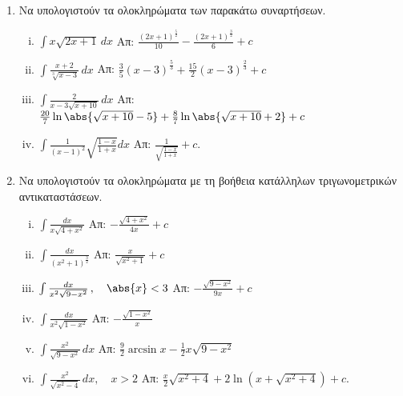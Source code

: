 \begin{enumerate}
  \item Να υπολογιστούν τα ολοκληρώματα των παρακάτω συναρτήσεων.
    \begin{enumerate}[i)]
      \item $\int x\sqrt{2x+1}\,dx$ 
        \hfill Απ: $\frac{(2x+1)^{\frac{5}{2}}}{10}-\frac{(2x+1)^{\frac{3}{2}}}{6}+c$
      \item $\int\frac{x+2}{\sqrt[3]{x-3}}\,dx$ 
        \hfill Απ: $\frac{3}{5}(x-3)^{\frac{5}{3}}+\frac{15}{2}(x-3)^{\frac{2}{3}}+c$
      \item $\int\frac{2}{x-3\sqrt{x+10}}\,dx$ 
        \hfill Απ: $\frac{20}{7}\ln\abs{\sqrt{x+10}-5}+\frac{8}{7}\ln
        \abs{\sqrt{x+10}+2}+c$
      \item $\int\frac{1}{(x-1)^2}\sqrt{\frac{1-x}{1+x}}dx$
        \hfill Απ: $\frac{1}{\sqrt{\frac{1-x}{1+x}}}+c$.
    \end{enumerate}

  \item Να υπολογιστούν τα ολοκληρώματα με τη βοήθεια κατάλληλων τριγωνομετρικών 
    αντικαταστάσεων.
    \begin{enumerate}[i)]
      \item $\int\frac{dx}{x\sqrt{4+x^2}}$ \hfill Απ: $-\frac{\sqrt{4+x^2}}{4x}+c$
      \item $\int\frac{dx}{(x^2+1)^{\frac{3}{2}}}$ \hfill Απ: $\frac{x}{\sqrt{x^2+1}}+c$
      \item $\int\frac{dx}{x^2\sqrt{9-x^2}}\,,\quad \abs{x}<3$ 
        \hfill Απ: $-\frac{\sqrt{9-x^2}}{9x}+c$
      \item $\int \frac{dx}{x^{2}\sqrt{1-x^{2}}}$ \hfill Απ: $-\frac{\sqrt{1-x^{2}}}{x}$
      \item $ \int \frac{x^{2}}{\sqrt{9-x^{2}}} \,{dx} $ \hfill Απ: $ \frac{9}{2}
        \arcsin{x} - \frac{1}{2} x \sqrt{9-x^{2}} $  
      \item $\int\frac{x^2}{\sqrt{x^2-4}}\,dx,\quad x>2$ 
        \hfill Απ: $\frac{x}{2}\sqrt{x^2+4}+2\ln(x+\sqrt{x^2+4})+c$.
    \end{enumerate}
\end{enumerate}





